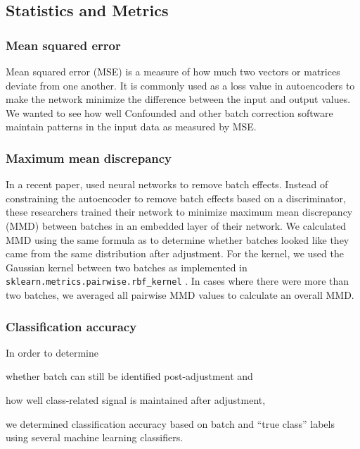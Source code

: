 \documentclass[11pt]{article}
\begin{document}
\subsection{Statistics and Metrics}

\subsubsection{Mean squared error}

Mean squared error (MSE) is a measure of how much two vectors or matrices deviate from one another.
It is commonly used as a loss value in autoencoders to make the network minimize the difference between the input and output values.
We wanted to see how well Confounded and other batch correction software maintain patterns in the input data as measured by MSE.

\subsubsection{Maximum mean discrepancy} \label{section:mmd}

In a recent paper, \citet{shaham_removal_2017} used neural networks to remove batch effects.
Instead of constraining the autoencoder to remove batch effects based on a discriminator, these researchers trained their network to minimize maximum mean discrepancy (MMD) between batches in an embedded layer of their network.
We calculated MMD using the same formula as \citeauthor{shaham_removal_2017} to determine whether batches looked like they came from the same distribution after adjustment.
For the kernel, we used the Gaussian kernel between two batches as implemented in \texttt{sklearn.metrics.pairwise.rbf\_kernel} \cite{pedregosa_scikit-learn_2011}.
In cases where there were more than two batches, we averaged all pairwise MMD values to calculate an overall MMD.

\subsubsection{Classification accuracy}

In order to determine \begin{enumerate*}[(a)]
	\item whether batch can still be identified post-adjustment and
	\item how well class-related signal is maintained after adjustment,
\end{enumerate*}
we determined classification accuracy based on batch and ``true class'' labels using several machine learning classifiers.
\end{document}
